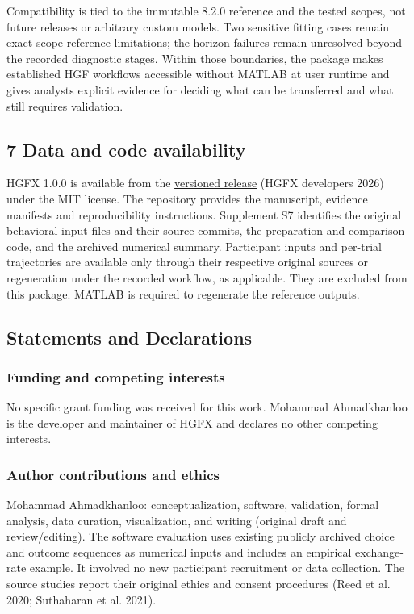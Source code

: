 \documentclass[
  11pt,
]{article}
\begin{document}
Compatibility is tied to the immutable 8.2.0 reference and the tested
scopes, not future releases or arbitrary custom models. Two sensitive
fitting cases remain exact-scope reference limitations; the horizon
failures remain unresolved beyond the recorded diagnostic stages. Within
those boundaries, the package makes established HGF workflows accessible
without MATLAB at user runtime and gives analysts explicit evidence for
deciding what can be transferred and what still requires validation.

\subsection{7 Data and code
availability}\label{data-and-code-availability}

HGFX 1.0.0 is available from the
\href{https://github.com/ahmadkhanloo/hgfx/releases/tag/v1.0.0}{versioned
release} (HGFX developers 2026) under the MIT license. The repository
provides the manuscript, evidence manifests and reproducibility
instructions. Supplement S7 identifies the original behavioral input
files and their source commits, the preparation and comparison code, and
the archived numerical summary. Participant inputs and per-trial
trajectories are available only through their respective original
sources or regeneration under the recorded workflow, as applicable. They
are excluded from this package. MATLAB is required to regenerate the
reference outputs.

\subsection{Statements and
Declarations}\label{statements-and-declarations}

\subsubsection{Funding and competing
interests}\label{funding-and-competing-interests}

No specific grant funding was received for this work. Mohammad
Ahmadkhanloo is the developer and maintainer of HGFX and declares no
other competing interests.

\subsubsection{Author contributions and
ethics}\label{author-contributions-and-ethics}

Mohammad Ahmadkhanloo: conceptualization, software, validation, formal
analysis, data curation, visualization, and writing (original draft and
review/editing). The software evaluation uses existing publicly archived
choice and outcome sequences as numerical inputs and includes an
empirical exchange-rate example. It involved no new participant
recruitment or data collection. The source studies report their original
ethics and consent procedures (Reed et al. 2020; Suthaharan et al.
2021).
\end{document}
